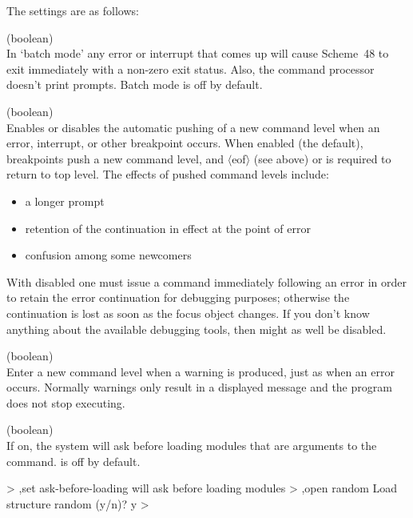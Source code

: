 The settings are as follows:
\begin{description}
\item {} (boolean)\\
    In `batch mode' any error or interrupt that comes up will cause
    Scheme~48 to exit immediately with a non-zero exit status.  Also,
    the command processor doesn't print prompts.  Batch mode is
    off by default.


\item {} (boolean)\\
    Enables or disables the automatic pushing of a new command level when
    an error, interrupt, or other breakpoint occurs.
    When enabled (the default), breakpoints push a new command level,
    and $\langle{}$eof$\rangle{}$ (see above)
    or  is required to return to top level.  The effects of
    pushed command levels include:
\begin{itemize}
\item a longer prompt
\item retention of the continuation in effect at the point of error
\item confusion among some newcomers
\end{itemize}
    With  disabled one must issue a
     command immediately
    following an error in order to retain the error continuation for
    debugging purposes; otherwise the continuation is lost as soon as
    the focus object changes.  If you don't know anything about the
    available debugging tools, then  might as well be disabled.

\item {} (boolean)\\
    Enter a new command level when a warning is produced, just as
    when an error occurs.  Normally warnings only result in a displayed
    message and the program does not stop executing.

\item {} (boolean)\\
    If on, the system will ask before loading modules that are arguments
    to the  command.   is off by
    default.
\begin{example}
> ,set ask-before-loading
will ask before loading modules
> ,open random
Load structure random (y/n)? y
>
\end{example}


\end{description}
